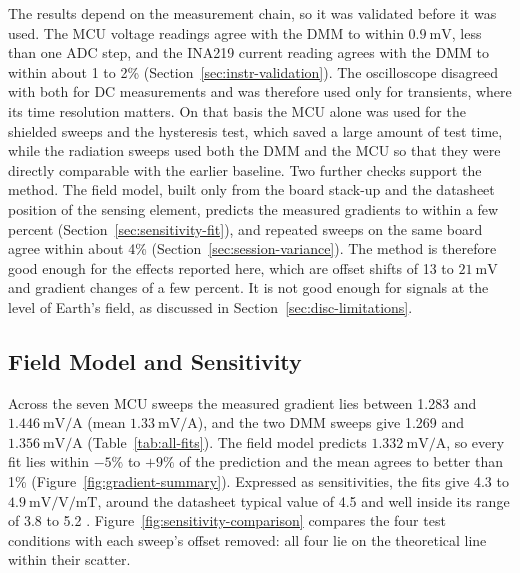 \documentclass[12pt,a4paper]{article}
\begin{document}
The results depend on the measurement chain, so it was validated before it was used. The MCU voltage readings agree with the DMM to within $\SI{0.9}{\milli\volt}$, less than one ADC step, and the INA219 current reading agrees with the DMM to within about 1 to 2\% (Section~\ref{sec:instr-validation}). The oscilloscope disagreed with both for DC measurements and was therefore used only for transients, where its time resolution matters. On that basis the MCU alone was used for the shielded sweeps and the hysteresis test, which saved a large amount of test time, while the radiation sweeps used both the DMM and the MCU so that they were directly comparable with the earlier baseline. Two further checks support the method. The field model, built only from the board stack-up and the datasheet position of the sensing element, predicts the measured gradients to within a few percent (Section~\ref{sec:sensitivity-fit}), and repeated sweeps on the same board agree within about 4\% (Section~\ref{sec:session-variance}). The method is therefore good enough for the effects reported here, which are offset shifts of 13 to $\SI{21}{\milli\volt}$ and gradient changes of a few percent. It is not good enough for signals at the level of Earth's field, as discussed in Section~\ref{sec:disc-limitations}.

\subsection{Field Model and Sensitivity}
\label{sec:disc-model}

Across the seven MCU sweeps the measured gradient lies between 1.283 and $\SI{1.446}{\milli\volt\per\ampere}$ (mean $\SI{1.33}{\milli\volt\per\ampere}$), and the two DMM sweeps give 1.269 and $\SI{1.356}{\milli\volt\per\ampere}$ (Table~\ref{tab:all-fits}). The field model predicts $\SI{1.332}{\milli\volt\per\ampere}$, so every fit lies within $-5\%$ to $+9\%$ of the prediction and the mean agrees to better than 1\% (Figure~\ref{fig:gradient-summary}). Expressed as sensitivities, the fits give 4.3 to $\SI{4.9}{\milli\volt\per\volt\per\milli\tesla}$, around the datasheet typical value of 4.5 and well inside its range of 3.8 to 5.2 \cite{ct100_datasheet}. Figure~\ref{fig:sensitivity-comparison} compares the four test conditions with each sweep's offset removed: all four lie on the theoretical line within their scatter.
\end{document}
